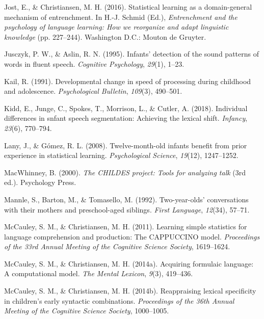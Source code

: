 \documentclass[man,mask,floatsintext]{apa6}
\begin{document}
\hypertarget{ref-jost201610}{}
Jost, E., \& Christiansen, M. H. (2016). Statistical learning as a
domain-general mechanism of entrenchment. In H.-J. Schmid (Ed.),
\emph{Entrenchment and the psychology of language learning: How we
reorganize and adapt linguistic knowledge} (pp. 227--244). Washington
D.C.: Mouton de Gruyter.

\hypertarget{ref-jusczyk1995infants}{}
Jusczyk, P. W., \& Aslin, R. N. (1995). Infants' detection of the sound
patterns of words in fluent speech. \emph{Cognitive Psychology},
\emph{29}(1), 1--23.

\hypertarget{ref-kail1991developmental}{}
Kail, R. (1991). Developmental change in speed of processing during
childhood and adolescence. \emph{Psychological Bulletin}, \emph{109}(3),
490--501.

\hypertarget{ref-kidd2018individual}{}
Kidd, E., Junge, C., Spokes, T., Morrison, L., \& Cutler, A. (2018).
Individual differences in snfant speech segmentation: Achieving the
lexical shift. \emph{Infancy}, \emph{23}(6), 770--794.

\hypertarget{ref-lany2008twelve}{}
Lany, J., \& Gómez, R. L. (2008). Twelve-month-old infants benefit from
prior experience in statistical learning. \emph{Psychological Science},
\emph{19}(12), 1247--1252.

\hypertarget{ref-childes}{}
MacWhinney, B. (2000). \emph{The CHILDES project: Tools for analyzing
talk} (3rd ed.). Psychology Press.

\hypertarget{ref-mannle1992twoyearolds}{}
Mannle, S., Barton, M., \& Tomasello, M. (1992). Two-year-olds'
conversations with their mothers and preschool-aged siblings.
\emph{First Language}, \emph{12}(34), 57--71.

\hypertarget{ref-mccauley2011learning}{}
McCauley, S. M., \& Christiansen, M. H. (2011). Learning simple
statistics for language comprehension and production: The CAPPUCCINO
model. \emph{Proceedings of the 33rd Annual Meeting of the Cognitive
Science Society}, 1619--1624.

\hypertarget{ref-mccauley2014acquiring}{}
McCauley, S. M., \& Christiansen, M. H. (2014a). Acquiring formulaic
language: A computational model. \emph{The Mental Lexicon}, \emph{9}(3),
419--436.

\hypertarget{ref-mccauley2014reappraising}{}
McCauley, S. M., \& Christiansen, M. H. (2014b). Reappraising lexical
specificity in children's early syntactic combinations.
\emph{Proceedings of the 36th Annual Meeting of the Cognitive Science
Society}, 1000--1005.
\end{document}
